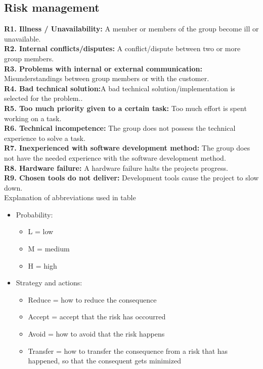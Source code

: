 

\subsection{Risk management}

\textbf{R1. Illness / Unavailability:} A member or members of the group become ill or unavailable. \\
\textbf{R2. Internal conflicts/disputes:} A conflict/dispute between two or more group members. \\
\textbf{R3. Problems with internal or external communication:} Misunderstandings between group members or with the customer. \\
\textbf{R4. Bad technical solution:}A bad technical solution/implementation is selected for the problem.. \\
\textbf{R5. Too much priority given to a certain task:} Too much effort is spent working on a task. \\
\textbf{R6. Technical incompetence:} The group does not possess the technical experience to solve a task. \\
\textbf{R7. Inexperienced with software development method:} The group does not have the needed experience with the software development method. \\
\textbf{R8. Hardware failure:} A hardware failure halts the projects progress. \\
\textbf{R9. Chosen tools do not deliver:} Development tools cause the project to slow down. \\

Explanation of abbreviations used in table%
\begin{itemize}
\item{}Probability:
\begin{itemize}
\item{}L = low
\item{}M = medium
\item{}H = high
\end{itemize}
\item{}Strategy and actions:
\begin{itemize}
\item{}Reduce = how to reduce the consequence
\item{}Accept = accept that the risk has occourred
\item{}Avoid = how to avoid that the risk happens
\item{}Transfer = how to transfer the consequence from a risk that has happened, so that the consequent gets minimized
\end{itemize}
\end{itemize}

